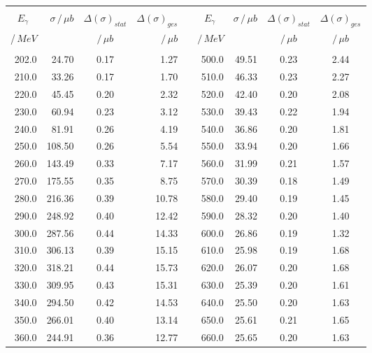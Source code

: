 \begin{table}[htbp] 
\begin{center} 
\begin{tabular}{|r|r|c|r|l|r|r|c|c|} 

\cline{1-4}
\cline{6-9} 
& & & & & & & &\\ 
$E_{\gamma}\;\;\;$ & 
$\sigma\,/\,{\mu}b$ & 
${\Delta}\left( \sigma\right)_{stat}$ & 
${\Delta}\left( \sigma\right)_{ges}$ & & 
$E_{\gamma}\;\;\;$ & 
$\sigma\,/\,{\mu}b$ & 
${\Delta}\left( \sigma\right)_{stat}$ & 
${\Delta}\left( \sigma\right)_{ges}$ \\ 
/$\,MeV$ &  & $/\,{\mu}b$ & $/\,{\mu}b$ & & $/\,MeV$ &  & $/\,{\mu}b$ & $/\,{\mu}b$ \\   & & & & & & & & \\ 
\cline{1-4} 
\cline{6-9} 
\cline{1-4} 
\cline{6-9} 
202.0 & 24.70 &  0.17 &  1.27 & & 500.0 & 49.51 &  0.23 &  2.44 \\ 
210.0 & 33.26 &  0.17 &  1.70 & & 510.0 & 46.33 &  0.23 &  2.27 \\ 
220.0 & 45.45 &  0.20 &  2.32 & & 520.0 & 42.40 &  0.20 &  2.08 \\ 
230.0 & 60.94 &  0.23 &  3.12 & & 530.0 & 39.43 &  0.22 &  1.94 \\ 
240.0 & 81.91 &  0.26 &  4.19 & & 540.0 & 36.86 &  0.20 &  1.81 \\ 
250.0 & 108.50 &  0.26 &  5.54 & & 550.0 & 33.94 &  0.20 &  1.66 \\ 
260.0 & 143.49 &  0.33 &  7.17 & & 560.0 & 31.99 &  0.21 &  1.57 \\ 
270.0 & 175.55 &  0.35 &  8.75 & & 570.0 & 30.39 &  0.18 &  1.49 \\ 
280.0 & 216.36 &  0.39 & 10.78 & & 580.0 & 29.40 &  0.19 &  1.45 \\ 
290.0 & 248.92 &  0.40 & 12.42 & & 590.0 & 28.32 &  0.20 &  1.40 \\ 
300.0 & 287.56 &  0.44 & 14.33 & & 600.0 & 26.86 &  0.19 &  1.32 \\ 
310.0 & 306.13 &  0.39 & 15.15 & & 610.0 & 25.98 &  0.19 &  1.68 \\ 
320.0 & 318.21 &  0.44 & 15.73 & & 620.0 & 26.07 &  0.20 &  1.68 \\ 
330.0 & 309.95 &  0.43 & 15.31 & & 630.0 & 25.39 &  0.20 &  1.61 \\ 
340.0 & 294.50 &  0.42 & 14.53 & & 640.0 & 25.50 &  0.20 &  1.63 \\ 
350.0 & 266.01 &  0.40 & 13.14 & & 650.0 & 25.61 &  0.21 &  1.65 \\ 
360.0 & 244.91 &  0.36 & 12.77 & & 660.0 & 25.65 &  0.20 &  1.63 \\ 

\end{tabular}
\end{center}
\end{table}
